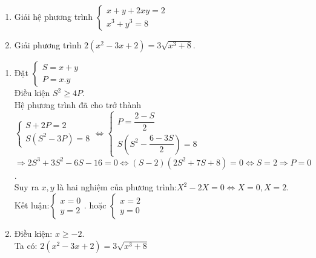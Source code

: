 \begin{ex}%
 \hfill
 \begin{enumerate}
         \item Giải hệ phương trình $\left\{ \begin{array}{l}
x + y + 2xy = 2\\
{x^3} + {y^3} = 8
\end{array} \right.$
        \item Giải phương trình
$2({x^2} - 3x + 2) = 3\sqrt {{x^3} + 8}$.
    \end{enumerate}
\loigiai
    {
    \begin{enumerate}
        \item Đặt
        $\left\{ \begin{array}{l}
        S = x + y\\
        P = x.y
                    \end{array} \right.$\\
        Điều kiện ${S^2} \ge 4P$.\\
        Hệ phương trình đã cho trở thành
        $\left\{ \begin{array}{l}
S + 2P = 2\\
S\left( {{S^2} - 3P} \right) = 8
\end{array} \right. \Leftrightarrow \left\{ \begin{array}{l}
P = \dfrac{{2 - S}}{2}\\
S\left( {{S^2} - \dfrac{{6 - 3S}}{2}} \right) = 8
\end{array} \right.$\\
$ \Rightarrow 2{S^3} + 3{S^2} - 6S - 16 = 0 \Leftrightarrow \left( {S - 2} \right)\left( {2{S^2} + 7S + 8} \right) = 0 \Leftrightarrow S = 2 \Rightarrow P = 0$. \\
Suy ra $x,y$ là hai nghiệm của phương trình:${X^2} - 2X = 0 \Leftrightarrow X = 0,X = 2$.\\
Kết luận:$\left\{ \begin{array}{l}
x = 0\\
y = 2
\end{array} \right.$.
 hoặc
 $\left\{ \begin{array}{l}
x = 2\\
y = 0
\end{array} \right.$
        \item Điều kiện: $x\geq -2$.\\
Ta có: $2({x^2} - 3x + 2) = 3\sqrt {{x^3} + 8} $\\

\end{enumerate}}
\end{ex}
